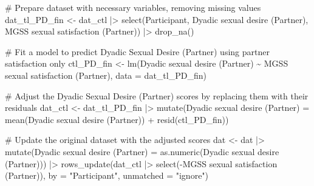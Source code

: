 \documentclass[
  bookmarksnumbered]{article}
\newenvironment{Shaded}{\begin{snugshade}}{\end{snugshade}}
\newcommand{\AttributeTok}[1]{\textcolor[rgb]{0.80,0.80,0.80}{#1}}
\newcommand{\CommentTok}[1]{\textcolor[rgb]{0.50,0.62,0.50}{#1}}
\newcommand{\FunctionTok}[1]{\textcolor[rgb]{0.94,0.94,0.56}{#1}}
\newcommand{\NormalTok}[1]{\textcolor[rgb]{0.80,0.80,0.80}{#1}}
\newcommand{\OtherTok}[1]{\textcolor[rgb]{0.94,0.94,0.56}{#1}}
\newcommand{\SpecialCharTok}[1]{\textcolor[rgb]{0.86,0.64,0.64}{#1}}
\newcommand{\StringTok}[1]{\textcolor[rgb]{0.80,0.58,0.58}{#1}}
\begin{document}
\begin{Shaded}
\begin{Highlighting}[]
\CommentTok{\# Prepare dataset with necessary variables, removing missing values}
\NormalTok{dat\_tl\_PD\_fin }\OtherTok{\textless{}{-}}\NormalTok{ dat\_ctl }\SpecialCharTok{|\textgreater{}}
  \FunctionTok{select}\NormalTok{(Participant, }\StringTok{\textasciigrave{}}\AttributeTok{Dyadic sexual desire (Partner)}\StringTok{\textasciigrave{}}\NormalTok{, }
         \StringTok{\textasciigrave{}}\AttributeTok{MGSS sexual satisfaction (Partner)}\StringTok{\textasciigrave{}}\NormalTok{) }\SpecialCharTok{|\textgreater{}}
  \FunctionTok{drop\_na}\NormalTok{()}

\CommentTok{\# Fit a model to predict Dyadic Sexual Desire (Partner) using partner satisfaction only}
\NormalTok{ctl\_PD\_fin }\OtherTok{\textless{}{-}} \FunctionTok{lm}\NormalTok{(}\StringTok{\textasciigrave{}}\AttributeTok{Dyadic sexual desire (Partner)}\StringTok{\textasciigrave{}} \SpecialCharTok{\textasciitilde{}} \StringTok{\textasciigrave{}}\AttributeTok{MGSS sexual satisfaction (Partner)}\StringTok{\textasciigrave{}}\NormalTok{, }
                 \AttributeTok{data =}\NormalTok{ dat\_tl\_PD\_fin)}

\CommentTok{\# Adjust the Dyadic Sexual Desire (Partner) scores by replacing them with their residuals}
\NormalTok{dat\_ctl }\OtherTok{\textless{}{-}}\NormalTok{ dat\_tl\_PD\_fin }\SpecialCharTok{|\textgreater{}}
  \FunctionTok{mutate}\NormalTok{(}\StringTok{\textasciigrave{}}\AttributeTok{Dyadic sexual desire (Partner)}\StringTok{\textasciigrave{}} \OtherTok{=} 
           \FunctionTok{mean}\NormalTok{(}\StringTok{\textasciigrave{}}\AttributeTok{Dyadic sexual desire (Partner)}\StringTok{\textasciigrave{}}\NormalTok{) }\SpecialCharTok{+} \FunctionTok{resid}\NormalTok{(ctl\_PD\_fin))}

\CommentTok{\# Update the original dataset with the adjusted scores}
\NormalTok{dat }\OtherTok{\textless{}{-}}\NormalTok{ dat }\SpecialCharTok{|\textgreater{}}
  \FunctionTok{mutate}\NormalTok{(}\StringTok{\textasciigrave{}}\AttributeTok{Dyadic sexual desire (Partner)}\StringTok{\textasciigrave{}} \OtherTok{=} \FunctionTok{as.numeric}\NormalTok{(}\StringTok{\textasciigrave{}}\AttributeTok{Dyadic sexual desire (Partner)}\StringTok{\textasciigrave{}}\NormalTok{)) }\SpecialCharTok{|\textgreater{}}
  \FunctionTok{rows\_update}\NormalTok{(dat\_ctl }\SpecialCharTok{|\textgreater{}} \FunctionTok{select}\NormalTok{(}\SpecialCharTok{{-}}\StringTok{\textasciigrave{}}\AttributeTok{MGSS sexual satisfaction (Partner)}\StringTok{\textasciigrave{}}\NormalTok{), }
              \AttributeTok{by =} \StringTok{"Participant"}\NormalTok{, }\AttributeTok{unmatched =} \StringTok{"ignore"}\NormalTok{)}
\end{Highlighting}
\end{Shaded}
\end{document}

